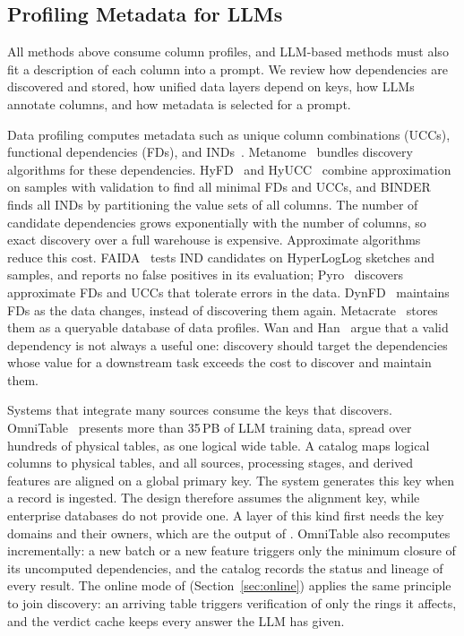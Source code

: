 \subsection{Profiling Metadata for LLMs}
\label{sec:bg_metadata}
All methods above consume column profiles, and LLM-based methods must also fit a description of each column into a prompt.
We review how dependencies are discovered and stored, how unified data layers depend on keys, how LLMs annotate columns, and how metadata is selected for a prompt.

 Data profiling computes metadata such as unique column combinations (UCCs), functional dependencies (FDs), and INDs~\cite{ProfilingSurvey}.
Metanome~\cite{Metanome} bundles discovery algorithms for these dependencies.
HyFD~\cite{HyFD} and HyUCC~\cite{HyUCC} combine approximation on samples with validation to find all minimal FDs and UCCs, and BINDER~\cite{BINDER} finds all INDs by partitioning the value sets of all columns.
The number of candidate dependencies grows exponentially with the number of columns, so exact discovery over a full warehouse is expensive.
Approximate algorithms reduce this cost.
FAIDA~\cite{FAIDA} tests IND candidates on HyperLogLog sketches and samples, and reports no false positives in its evaluation; Pyro~\cite{Pyro} discovers approximate FDs and UCCs that tolerate errors in the data.
DynFD~\cite{DynFD} maintains FDs as the data changes, instead of discovering them again.
Metacrate~\cite{Metacrate} stores them as a queryable database of data profiles.
Wan and Han~\cite{ValueDriven} argue that a valid dependency is not always a useful one: discovery should target the dependencies whose value for a downstream task exceeds the cost to discover and maintain them.

 Systems that integrate many sources consume the keys that \ourmethod discovers.
OmniTable~\cite{OmniTable} presents more than 35\,PB of LLM training data, spread over hundreds of physical tables, as one logical wide table.
A catalog maps logical columns to physical tables, and all sources, processing stages, and derived features are aligned on a global primary key.
The system generates this key when a record is ingested.
The design therefore assumes the alignment key, while enterprise databases do not provide one.
A layer of this kind first needs the key domains and their owners, which are the output of \ourmethod.
OmniTable also recomputes incrementally: a new batch or a new feature triggers only the minimum closure of its uncomputed dependencies, and the catalog records the status and lineage of every result.
The online mode of \ourmethod (Section~\ref{sec:online}) applies the same principle to join discovery: an arriving table triggers verification of only the rings it affects, and the verdict cache keeps every answer the LLM has given.

